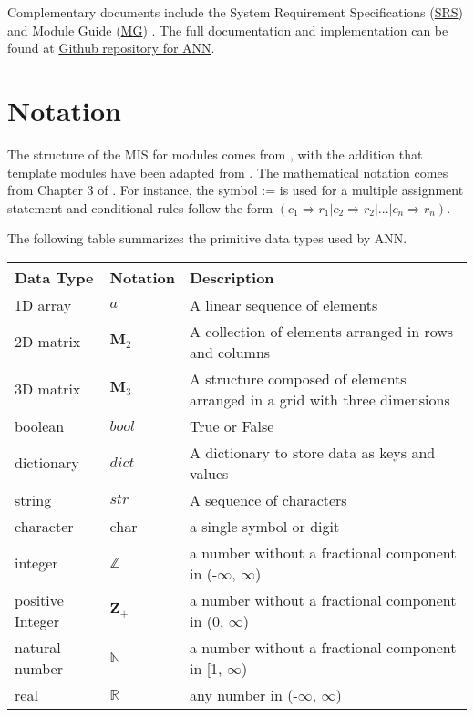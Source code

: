 \documentclass[12pt, titlepage]{article}
\begin{document}
Complementary documents include the System Requirement Specifications 
(\href{https://github.com/tanya-jp/ANN-CAS741/blob/main/docs/SRS/SRS.pdf}{SRS}) \cite{SRS}
and Module Guide (\href{https://github.com/tanya-jp/ANN-CAS741/blob/main/docs/Design/SoftArchitecture/MG.pdf}{MG}) \cite{MG}.  
The full documentation and implementation can be
found at \href{https://github.com/tanya-jp/ANN-CAS741/tree/main}{Github repository for ANN}.

\section{Notation}


The structure of the MIS for modules comes from \citet{HoffmanAndStrooper1995},
with the addition that template modules have been adapted from
\cite{GhezziEtAl2003}.  The mathematical notation comes from Chapter 3 of
\citet{HoffmanAndStrooper1995}.  For instance, the symbol := is used for a
multiple assignment statement and conditional rules follow the form $(c_1
\Rightarrow r_1 | c_2 \Rightarrow r_2 | ... | c_n \Rightarrow r_n )$.

The following table summarizes the primitive data types used by ANN. 

\begin{center}
\renewcommand{\arraystretch}{1.2}
\noindent 
\begin{tabular}{l l p{7.5cm}} 
\toprule 
\textbf{Data Type} & \textbf{Notation} & \textbf{Description}\\ 
\midrule
1D array & ${a}$ & A linear sequence of elements\\
2D matrix & $\mathbf{M}_{2}$ &  A collection of elements arranged in rows and columns\\
3D matrix & $\mathbf{M}_{3}$ & A structure composed of elements arranged in a grid with three dimensions\\ 
boolean & $bool$ & True or False\\
dictionary & $dict$ & A dictionary to store data as keys and values\\
string & $str$ & A sequence of characters\\
character & char & a single symbol or digit\\
integer & $\mathbb{Z}$ & a number without a fractional component in (-$\infty$, $\infty$) \\
positive Integer & $\mathbf{Z}_{+}$ & a number without a fractional component in ($0$, $\infty$) \\
natural number & $\mathbb{N}$ & a number without a fractional component in [1, $\infty$) \\
real & $\mathbb{R}$ & any number in (-$\infty$, $\infty$)\\
\bottomrule
\end{tabular} 
\end{center}
\end{document}
